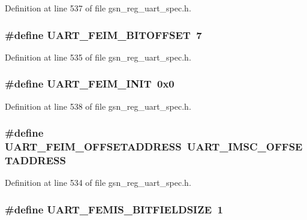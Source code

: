 Definition at line 537 of file gsn\_\-reg\_\-uart\_\-spec.h.

\hypertarget{a00575_a66a45567b814dec7621bb268c7d6e59b}{
\subsubsection[{UART\_\-FEIM\_\-BITOFFSET}]{\setlength{\rightskip}{0pt plus 5cm}\#define UART\_\-FEIM\_\-BITOFFSET~7}}
\label{a00575_a66a45567b814dec7621bb268c7d6e59b}


Definition at line 535 of file gsn\_\-reg\_\-uart\_\-spec.h.

\hypertarget{a00575_af8be0d9f50ab0a0212688dadef31a331}{
\subsubsection[{UART\_\-FEIM\_\-INIT}]{\setlength{\rightskip}{0pt plus 5cm}\#define UART\_\-FEIM\_\-INIT~0x0}}
\label{a00575_af8be0d9f50ab0a0212688dadef31a331}


Definition at line 538 of file gsn\_\-reg\_\-uart\_\-spec.h.

\hypertarget{a00575_ab1cac746b568e7e38c1abc2caab28616}{
\subsubsection[{UART\_\-FEIM\_\-OFFSETADDRESS}]{\setlength{\rightskip}{0pt plus 5cm}\#define UART\_\-FEIM\_\-OFFSETADDRESS~UART\_\-IMSC\_\-OFFSETADDRESS}}
\label{a00575_ab1cac746b568e7e38c1abc2caab28616}


Definition at line 534 of file gsn\_\-reg\_\-uart\_\-spec.h.

\hypertarget{a00575_ac906fc0917a81985e74a007f3c83f98a}{
\subsubsection[{UART\_\-FEMIS\_\-BITFIELDSIZE}]{\setlength{\rightskip}{0pt plus 5cm}\#define UART\_\-FEMIS\_\-BITFIELDSIZE~1}}
\label{a00575_ac906fc0917a81985e74a007f3c83f98a}


